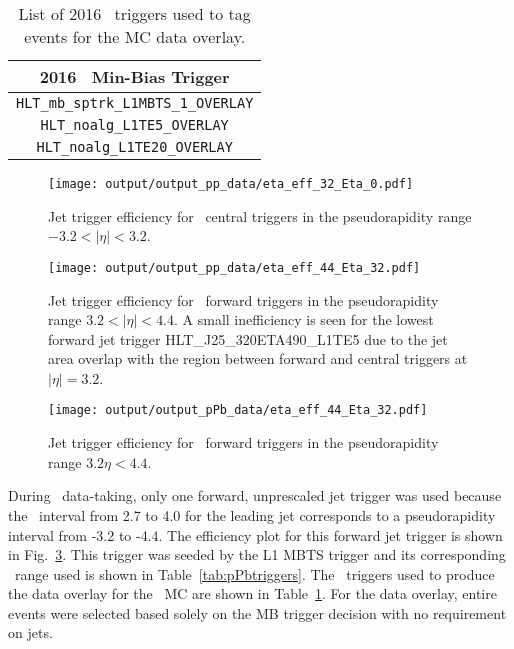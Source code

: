 \begin{table}
	\centering
	\begin{tabular}{|| c || } 
		\hline 
		2016 \pPb\ Min-Bias Trigger \\ 
		\hline
		\verb|HLT_mb_sptrk_L1MBTS_1_OVERLAY|  \\ 
		\verb|HLT_noalg_L1TE5_OVERLAY|  \\ 
		\verb|HLT_noalg_L1TE20_OVERLAY|  \\ 
		\hline
	\end{tabular}
	\caption{\label{tab:pPbOverlaytriggers} List of 2016 \pPb\ triggers used to tag events for the MC data overlay.}
\end{table}


\begin{figure}
	\centerline{
		\texttt{[image: output/output\_pp\_data/eta\_eff\_32\_Eta\_0.pdf]} }
	\caption{Jet trigger efficiency for \pp\ central triggers in the pseudorapidity range $-3.2<|\eta|<3.2$.}
	\label{fig:ppeffcent}
\end{figure}

\begin{figure}
	\centerline{
		\texttt{[image: output/output\_pp\_data/eta\_eff\_44\_Eta\_32.pdf]} }
	\caption{Jet trigger efficiency for \pp\ forward triggers in the pseudorapidity range $3.2<|\eta|<4.4$. A small inefficiency is seen for the lowest forward jet trigger \textsc{HLT\_J25\_320ETA490\_L1TE5} due to the jet area overlap with the region between forward and central triggers at $|\eta| = 3.2$. }
	\label{fig:ppefffwd}
\end{figure}

\begin{figure}
	\centerline{
		\texttt{[image: output/output\_pPb\_data/eta\_eff\_44\_Eta\_32.pdf]} }
	\caption{Jet trigger efficiency for \pPb\ forward triggers in the pseudorapidity range $3.2\eta<4.4$.}
	\label{fig:pPbefffwd}
\end{figure}

During \pPb\ data-taking, only one forward, unprescaled jet trigger was used because the \ystar\ interval from 2.7 to 4.0 for the leading jet corresponds to a pseudorapidity interval from -3.2 to -4.4. The efficiency plot for this forward jet trigger is shown in Fig.~\ref{fig:pPbefffwd}. This trigger was seeded by the L1 MBTS trigger and its corresponding \pt\ range used is shown in Table~\ref{tab:pPbtriggers}. The \pPb\ triggers used to produce the data overlay for the \pPb\ MC are shown in Table~\ref{tab:pPbOverlaytriggers}. For the data overlay, entire events were selected based solely on the MB trigger decision with no requirement on jets.


